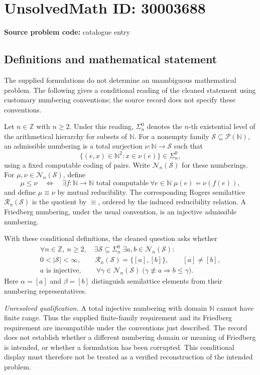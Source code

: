 \documentclass[11pt]{article}
\newcommand{\N}{\mathbb{N}}
\newcommand{\Z}{\mathbb{Z}}
\begin{document}
\section*{UnsolvedMath ID: 30003688}
\textbf{Source problem code:} catalogue entry
\subsection{Definitions and mathematical statement}
The supplied formulations do not determine an unambiguous mathematical problem. The following gives a conditional reading of the cleaned statement using customary numbering conventions; the source record does not specify these conventions.

Let \(n\in\Z\) with \(n\geq2\). Under this reading, \(\Sigma_n^0\) denotes the \(n\)-th existential level of the arithmetical hierarchy for subsets of \(\N\). For a nonempty family \(\mathcal S\subseteq\mathcal P(\N)\), an admissible numbering is a total surjection \(\nu:\N\to\mathcal S\) such that
\[
\{(e,x)\in\N^2:x\in\nu(e)\}\in\Sigma_n^0,
\]
using a fixed computable coding of pairs. Write \(\mathcal N_n(\mathcal S)\) for these numberings. For \(\mu,\nu\in\mathcal N_n(\mathcal S)\), define
\[
\mu\leq\nu
\quad\Longleftrightarrow\quad
\exists f:\N\to\N\text{ total computable}\ \forall e\in\N\;
\mu(e)=\nu(f(e)),
\]
and define \(\mu\equiv\nu\) by mutual reducibility. The corresponding Rogers semilattice \(\mathcal R_n(\mathcal S)\) is the quotient by \(\equiv\), ordered by the induced reducibility relation. A Friedberg numbering, under the usual convention, is an injective admissible numbering.

With these conditional definitions, the cleaned question asks whether
\[
\begin{gathered}
\forall n\in\Z,\ n\geq2,\quad
\exists\mathcal S\subseteq\Sigma_n^0\;
\exists a,b\in\mathcal N_n(\mathcal S):\\
0<|\mathcal S|<\infty,\qquad
\mathcal R_n(\mathcal S)=\{[a],[b]\},\qquad [a]\neq[b],\\
a\text{ is injective},\qquad
\forall\gamma\in\mathcal N_n(\mathcal S)\;
\bigl(\gamma\not\equiv a\Longrightarrow b\leq\gamma\bigr).
\end{gathered}
\]
Here \(\alpha=[a]\) and \(\beta=[b]\) distinguish semilattice elements from their numbering representatives.

\emph{Unresolved qualification.} A total injective numbering with domain \(\N\) cannot have finite range. Thus the supplied finite-family requirement and its Friedberg requirement are incompatible under the conventions just described. The record does not establish whether a different numbering domain or meaning of Friedberg is intended, or whether a formulation has been corrupted. This conditional display must therefore not be treated as a verified reconstruction of the intended problem.
\end{document}
